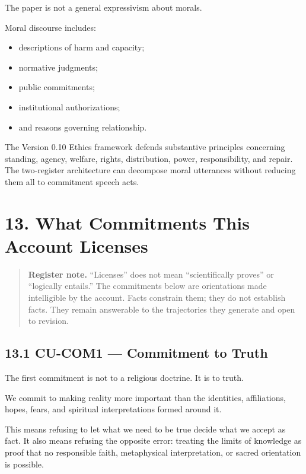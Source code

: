 \documentclass[
  11pt,
]{article}
\providecommand{\tightlist}{%
  \setlength{\itemsep}{0pt}\setlength{\parskip}{0pt}}
\begin{document}
The paper is not a general expressivism about morals.

Moral discourse includes:

\begin{itemize}
\tightlist
\item
  descriptions of harm and capacity;
\item
  normative judgments;
\item
  public commitments;
\item
  institutional authorizations;
\item
  and reasons governing relationship.
\end{itemize}

The Version 0.10 Ethics framework defends substantive principles
concerning standing, agency, welfare, rights, distribution, power,
responsibility, and repair. The two-register architecture can decompose
moral utterances without reducing them all to commitment speech acts.

\section{13. What Commitments This Account
Licenses}\label{what-commitments-this-account-licenses}

\begin{quote}
\textbf{Register note.} ``Licenses'' does not mean ``scientifically
proves'' or ``logically entails.'' The commitments below are
orientations made intelligible by the account. Facts constrain them;
they do not establish facts. They remain answerable to the trajectories
they generate and open to revision.
\end{quote}

\subsection{13.1 CU-COM1 --- Commitment to
Truth}\label{cu-com1-commitment-to-truth}

The first commitment is not to a religious doctrine. It is to truth.

We commit to making reality more important than the identities,
affiliations, hopes, fears, and spiritual interpretations formed around
it.

This means refusing to let what we need to be true decide what we accept
as fact. It also means refusing the opposite error: treating the limits
of knowledge as proof that no responsible faith, metaphysical
interpretation, or sacred orientation is possible.
\end{document}
